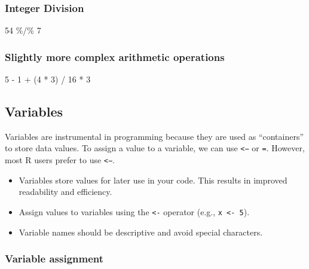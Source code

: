 \documentclass[
  letterpaper,
  DIV=11,
  numbers=noendperiod]{scrreprt}
\newenvironment{Shaded}{}{}
\newcommand{\DecValTok}[1]{\textcolor[rgb]{0.00,0.36,0.77}{#1}}
\newcommand{\NormalTok}[1]{\textcolor[rgb]{0.14,0.16,0.18}{#1}}
\newcommand{\SpecialCharTok}[1]{\textcolor[rgb]{0.00,0.36,0.77}{#1}}
\providecommand{\tightlist}{%
  \setlength{\itemsep}{0pt}\setlength{\parskip}{0pt}}\usepackage{longtable,booktabs,array}
\begin{document}
\subsubsection{Integer Division}\label{integer-division}

\begin{Shaded}
\begin{Highlighting}[]
\DecValTok{54} \SpecialCharTok{\%/\%} \DecValTok{7}
\end{Highlighting}
\end{Shaded}

\subsubsection{Slightly more complex arithmetic
operations}\label{slightly-more-complex-arithmetic-operations}

\begin{Shaded}
\begin{Highlighting}[]
\DecValTok{5} \SpecialCharTok{{-}} \DecValTok{1} \SpecialCharTok{+}\NormalTok{ (}\DecValTok{4} \SpecialCharTok{*} \DecValTok{3}\NormalTok{) }\SpecialCharTok{/} \DecValTok{16} \SpecialCharTok{*} \DecValTok{3}
\end{Highlighting}
\end{Shaded}

\subsection{Variables}\label{variables}

Variables are instrumental in programming because they are used as
``containers'' to store data values. To assign a value to a variable, we
can use \texttt{\textless{}−} or \texttt{=}. However, most R users
prefer to use \texttt{\textless{}−}.

\begin{itemize}
\tightlist
\item
  Variables store values for later use in your code. This results in
  improved readability and efficiency.
\item
  Assign values to variables using the \texttt{\textless{}-} operator
  (e.g., \texttt{x\ \textless{}-\ 5}).
\item
  Variable names should be descriptive and avoid special characters.
\end{itemize}

\subsubsection{Variable assignment}\label{variable-assignment}
\end{document}

